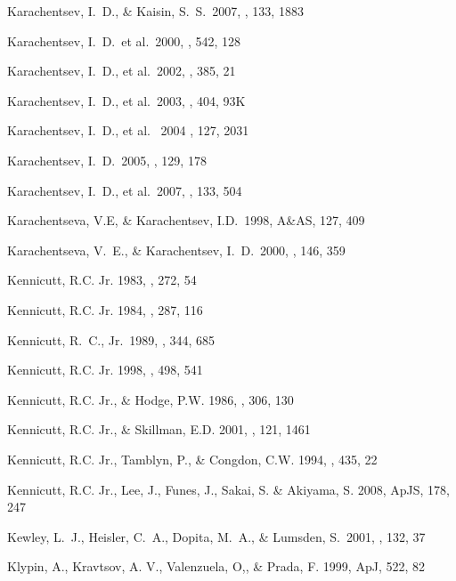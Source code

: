 \documentclass[12pt,preprint]{aastex}
\begin{document}
\begin{thebibliography}{}
Karachentsev, I.~D., \& Kaisin, S.~S.\ 2007, \aj, 133, 1883 

Karachentsev, I.~D.~et al.\ 2000, \apj, 542, 128 

Karachentsev, I.~D., et al.\ 2002, \aap, 385, 21

Karachentsev, I.~D., et al.\ 2003, \aap, 404, 93K 

Karachentsev, I.~D., et al. \ 2004 \aj, 127, 2031

Karachentsev, I.~D.\ 2005, \aj, 129, 178 

Karachentsev, I.~D., et al.\ 2007, \aj, 133, 504 

Karachentseva, V.E, \& Karachentsev, I.D.\ 1998, A\&AS, 127, 409 

Karachentseva, V.~E., \& Karachentsev, I.~D.\ 2000, \aaps, 146, 359 

Kennicutt, R.C. Jr. 1983, \apj , 272, 54

Kennicutt, R.C. Jr. 1984, \apj , 287, 116

Kennicutt, R.~C., Jr.\ 1989, \apj, 344, 685 

Kennicutt, R.C. Jr. 1998, \apj , 498, 541

Kennicutt, R.C. Jr., \& Hodge, P.W. 1986, \apj , 306, 130

Kennicutt, R.C. Jr., \& Skillman, E.D. 2001, \aj , 121, 1461 

Kennicutt, R.C. Jr., Tamblyn, P., \& Congdon, C.W. 1994, \apj , 435, 22

Kennicutt, R.C. Jr., Lee, J., Funes, J., Sakai, S. \& Akiyama, S. 2008, ApJS, 178, 247

Kewley, L.~J., Heisler, C.~A., Dopita, M.~A., \& Lumsden, S.\ 2001, \apjs, 132, 37 

Klypin, A., Kravtsov, A. V., Valenzuela, O,, \& Prada, F. 1999, ApJ, 522, 82


\end{thebibliography}
\end{document}
